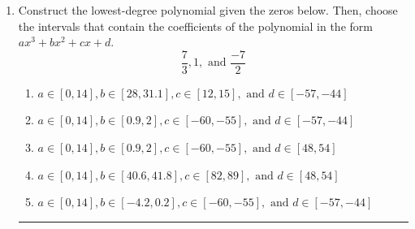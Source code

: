 \documentclass[14pt]{extbook}
\newcommand{\litem}[1]{\item#1\hspace*{-1cm}\rule{\textwidth}{0.4pt}}
\begin{document}
\begin{enumerate}
{\begin{enumerate}[label=\Alph*.]
\end{enumerate} }
\litem{
Construct the lowest-degree polynomial given the zeros below. Then, choose the intervals that contain the coefficients of the polynomial in the form $ax^3+bx^2+cx+d$.\[ \frac{7}{3}, 1, \text{ and } \frac{-7}{2} \]\begin{enumerate}[label=\Alph*.]
\item \( a \in [0, 14], b \in [28, 31.1], c \in [12, 15], \text{ and } d \in [-57, -44] \)
\item \( a \in [0, 14], b \in [0.9, 2], c \in [-60, -55], \text{ and } d \in [-57, -44] \)
\item \( a \in [0, 14], b \in [0.9, 2], c \in [-60, -55], \text{ and } d \in [48, 54] \)
\item \( a \in [0, 14], b \in [40.6, 41.8], c \in [82, 89], \text{ and } d \in [48, 54] \)
\item \( a \in [0, 14], b \in [-4.2, 0.2], c \in [-60, -55], \text{ and } d \in [-57, -44] \)


\end{enumerate}}
\end{enumerate}
\end{document}

